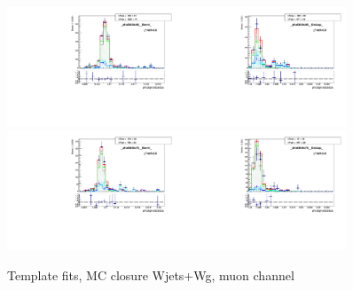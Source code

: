 \begin{figure}[htb]
\begin{center}
   \includegraphics[width=0.45\textwidth]{../figs/figs_v11/MUON_WGamma/MCclosureWjetsPlusWg/c_TEMPL_SIHIH_UNblind__phoEt55to65__Barrel__RooFit_MCclosure.pdf}\includegraphics[width=0.45\textwidth]{../figs/figs_v11/MUON_WGamma/MCclosureWjetsPlusWg/c_TEMPL_SIHIH_UNblind__phoEt55to65__Endcap__RooFit_MCclosure.pdf}\\
   \includegraphics[width=0.45\textwidth]{../figs/figs_v11/MUON_WGamma/MCclosureWjetsPlusWg/c_TEMPL_SIHIH_UNblind__phoEt65to75__Barrel__RooFit_MCclosure.pdf}\includegraphics[width=0.45\textwidth]{../figs/figs_v11/MUON_WGamma/MCclosureWjetsPlusWg/c_TEMPL_SIHIH_UNblind__phoEt65to75__Endcap__RooFit_MCclosure.pdf}\\
  \label{fig:templateFits_MCclosureWjetsPlusWg_SIHIH_MUON_2}
  \caption{Template fits, MC closure Wjets+Wg, muon channel}
  \end{center}
\end{figure}

